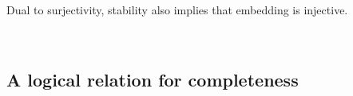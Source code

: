 \documentclass[authoryear, acmsmall, screen, review, nonacm]{acmart}
\begin{document}
Dual to surjectivity, stability also implies that embedding is injective.
 
\begin{code}%
\>[0]\AgdaSpace{}%
\AgdaSymbol{:}\AgdaSpace{}%
\AgdaSpace{}%
\AgdaSymbol{(}\AgdaSpace{}%
\AgdaSpace{}%
\AgdaSymbol{:}\AgdaSpace{}%
\AgdaSpace{}%
\AgdaSpace{}%
\AgdaSymbol{)}\AgdaSpace{}%
\AgdaSpace{}%
\AgdaSpace{}%
\AgdaSpace{}%
\AgdaSpace{}%
\AgdaSpace{}%
\AgdaSpace{}%
\AgdaSpace{}%
\AgdaSpace{}%
\AgdaSpace{}%
\<%
\\
\>[0]\AgdaSpace{}%
\AgdaSpace{}%
\AgdaSpace{}%
\AgdaSpace{}%
\AgdaSymbol{=}\AgdaSpace{}%
\AgdaSpace{}%
\AgdaSymbol{(}\AgdaSpace{}%
\AgdaSymbol{(}\AgdaSpace{}%
\AgdaSymbol{))}\AgdaSpace{}%
\AgdaSymbol{(}\AgdaSpace{}%
\AgdaSymbol{(}\AgdaSpace{}%
\AgdaSpace{}%
\AgdaSymbol{)}\AgdaSpace{}%
\AgdaSymbol{(}\AgdaSpace{}%
\AgdaSymbol{))}\<%
\end{code}

\subsection{A logical relation for completeness}
\end{document}
